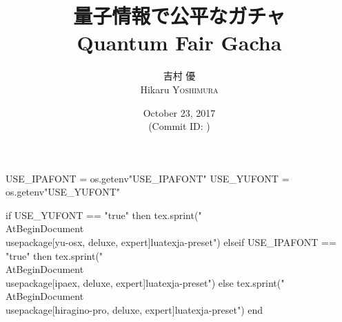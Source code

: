 \hypersetup{colorlinks,linkcolor=,urlcolor=links}

\beamertemplatenavigationsymbolsempty


\usepackage{luacode}
\usepackage{luatexja}
\usepackage{pgfpages}
\usepackage[osf]{mathpazo}

\begin{luacode*}
  USE_IPAFONT = os.getenv"USE_IPAFONT"
  USE_YUFONT = os.getenv"USE_YUFONT"
  
  if USE_YUFONT == "true" then
    tex.sprint("\\AtBeginDocument{\\usepackage[yu-osx, deluxe, expert]{luatexja-preset}}")
  elseif USE_IPAFONT == "true" then
    tex.sprint("\\AtBeginDocument{\\usepackage[ipaex, deluxe, expert]{luatexja-preset}}")
  else
    tex.sprint("\\AtBeginDocument{\\usepackage[hiragino-pro, deluxe, expert]{luatexja-preset}}")
  end
\end{luacode*}

\usepackage{epigraph}
\usepackage{etoolbox}
\usepackage{tikz}
\usepackage{framed}
\usepackage[ss]{libertine}
\usepackage{amsmath}
\usepackage{mathtools}
\usepackage{braket}

\renewcommand{\kanjifamilydefault}{\gtdefault}


\setmonofont[Ligatures=TeX]{CMU Typewriter Text}



\title[量子情報で公平なガチャ]{%
  量子情報で公平なガチャ \\
  {\normalsize Quantum Fair Gacha} 
}
\author[吉村 優]{%
  吉村 優 \\
  Hikaru \textsc{Yoshimura}
}
\date[October 23, 2017]{%
  October 23, 2017 \\%
  {\footnotesize (Commit ID: \GITAbrHash)}
}





